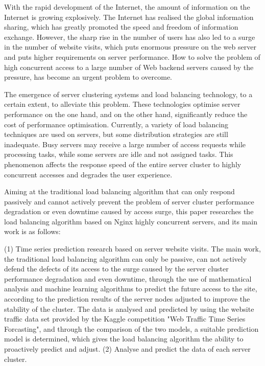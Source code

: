 
\begin{eabstract} 
With the rapid development of the Internet, the amount of information on the Internet is growing explosively. The Internet has realised the global information sharing, which has greatly promoted the speed and freedom of information exchange. However, the sharp rise in the number of users has also led to a surge in the number of website visits, which puts enormous pressure on the web server and puts higher requirements on server performance. How to solve the problem of high concurrent access to a large number of Web backend servers caused by the pressure, has become an urgent problem to overcome.

The emergence of server clustering systems and load balancing technology, to a certain extent, to alleviate this problem. These technologies optimise server performance on the one hand, and on the other hand, significantly reduce the cost of performance optimisation. Currently, a variety of load balancing techniques are used on servers, but some distribution strategies are still inadequate. Busy servers may receive a large number of access requests while processing tasks, while some servers are idle and not assigned tasks. This phenomenon affects the response speed of the entire server cluster to highly concurrent accesses and degrades the user experience.
    
Aiming at the traditional load balancing algorithm that can only respond passively and cannot actively prevent the problem of server cluster performance degradation or even downtime caused by access surge, this paper researches the load balancing algorithm based on Nginx highly concurrent servers, and its main work is as follows:
    
(1) Time series prediction research based on server website visits. The main work, the traditional load balancing algorithm can only be passive, can not actively defend the defects of its access to the surge caused by the server cluster performance degradation and even downtime, through the use of mathematical analysis and machine learning algorithms to predict the future access to the site, according to the prediction results of the server nodes adjusted to improve the stability of the cluster. The data is analysed and predicted by using the website traffic data set provided by the Kaggle competition "Web Traffic Time Series Forcasting", and through the comparison of the two models, a suitable prediction model is determined, which gives the load balancing algorithm the ability to proactively predict and adjust. (2) Analyse and predict the data of each server cluster.
    

\end{eabstract}
